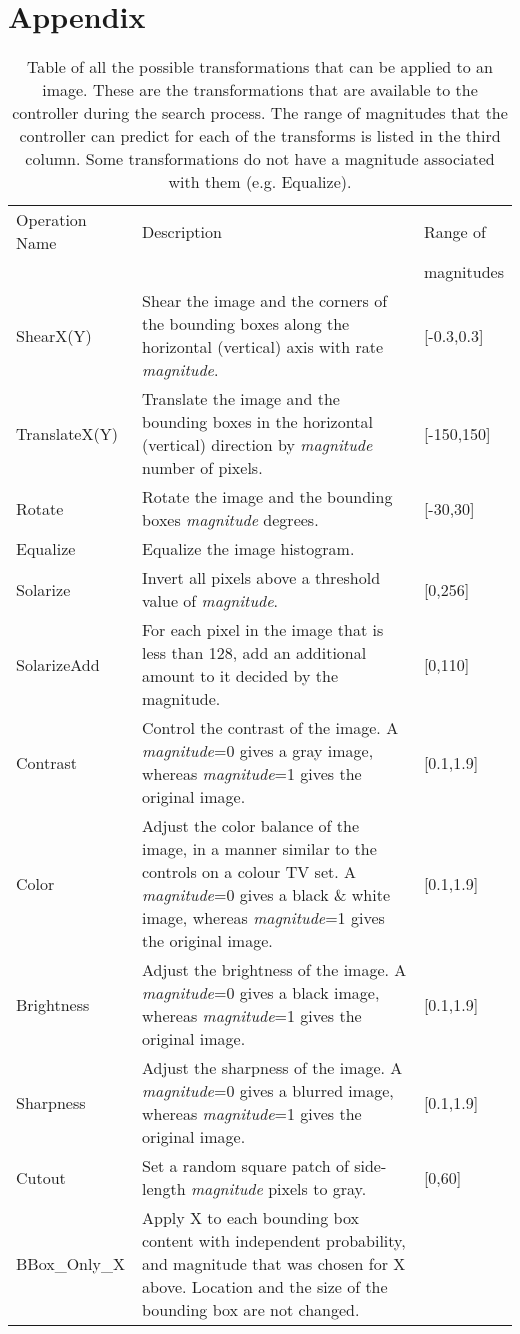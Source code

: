 \documentclass[10pt,twocolumn,letterpaper]{article}
\begin{document}
\section{Appendix}
\begin{table*}[tbh!]
\centering
\small
\begin{tabular}{l p{12cm} p{1.35cm}}
\hline
  Operation Name & Description & Range of \\ 
                 &             & magnitudes \\ 
  \hline
  ShearX(Y) & Shear the image and the corners of the bounding boxes along the horizontal (vertical) axis with rate \emph{magnitude}.  & [-0.3,0.3]  \\ 
  TranslateX(Y) & Translate the image and the bounding boxes in the horizontal (vertical) direction by \emph{magnitude} number of pixels.   & [-150,150] \\ 
  Rotate & Rotate the image and the bounding boxes \emph{magnitude} degrees. & [-30,30] \\ 
  Equalize & Equalize the image histogram. &\\ 
  Solarize & Invert all pixels above a threshold value of \emph{magnitude}.  & [0,256] \\ 
  SolarizeAdd &  For each pixel in the image that is less than 128, add an additional amount to it decided by the magnitude. & [0,110] \\ 
  Contrast & Control the contrast of the image. A \emph{magnitude}=0 gives a gray image, whereas \emph{magnitude}=1 gives the original image.    & [0.1,1.9]\\
  Color & Adjust the color balance of the image,  in a manner similar to the controls on a colour TV set. A \emph{magnitude}=0 gives a black \& white image, whereas \emph{magnitude}=1 gives the original image.  & [0.1,1.9]\\ 
  Brightness & Adjust the brightness of the image. A \emph{magnitude}=0 gives a black image, whereas \emph{magnitude}=1 gives the original image.   & [0.1,1.9] \\
  Sharpness & Adjust the sharpness of the image. A \emph{magnitude}=0 gives a blurred image, whereas \emph{magnitude}=1 gives the original image.   & [0.1,1.9] \\ 
  Cutout~\cite{cutout2017,zhong2017random} & Set a random square patch of side-length \emph{magnitude} pixels to gray. & [0,60] \\
  BBox\_Only\_X & Apply X to each bounding box content with independent probability, and magnitude that was chosen for X above. Location and the size of the bounding box are not changed. & \\
\hline
\end{tabular}
\caption{Table of all the possible transformations that can be applied to an image. These are the transformations that are available to the controller during the search process. The range of magnitudes that the controller can predict for each of the transforms is listed in the third column. Some transformations do not have a magnitude associated with them (e.g. Equalize).}
\label{tab:ops}
\end{table*}
\end{document}
